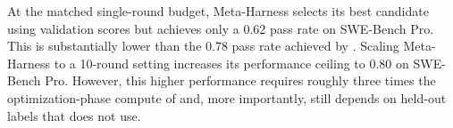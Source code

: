 At the matched single-round budget, Meta-Harness selects its best candidate using validation scores but achieves only a 0.62 pass rate on SWE-Bench Pro.
This is substantially lower than the 0.78 pass rate achieved by \method{}.
Scaling Meta-Harness to a 10-round setting increases its performance ceiling to 0.80 on SWE-Bench Pro.
However, this higher performance requires roughly three times the optimization-phase compute of \method{} and, more importantly, still depends on held-out labels that \method{} does not use.
